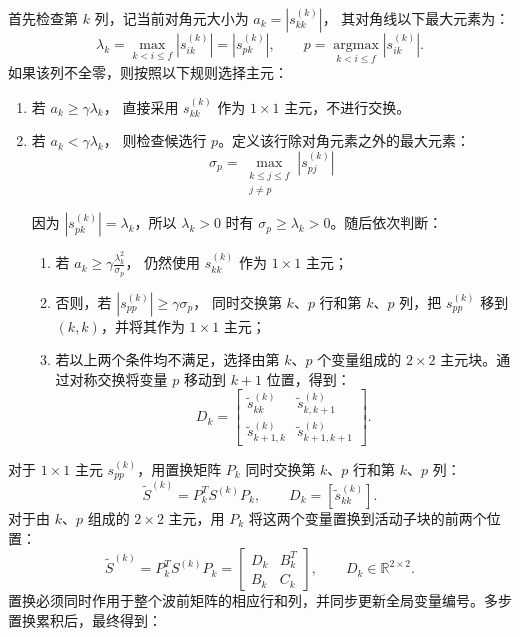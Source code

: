 首先检查第 $k$ 列，记当前对角元大小为 $a_k=\left|s_{kk}^{(k)}\right|$，
其对角线以下最大元素为：
$$
\lambda_k=\max_{k<i\le f}\left|s_{ik}^{(k)}\right|
=\left|s_{pk}^{(k)}\right|,\qquad
p=\underset{k<i\le f}{\operatorname{argmax}}
  \left|s_{ik}^{(k)}\right|.$$
如果该列不全零，则按照以下规则选择主元：
\begin{enumerate}
  \item 若
  $a_k\ge\gamma\lambda_k$，
  直接采用 $s_{kk}^{(k)}$ 作为 $1\times1$ 主元，不进行交换。

  \item 若
  $a_k<\gamma\lambda_k$，
  则检查候选行 $p$。定义该行除对角元素之外的最大元素：
  $$\sigma_p=
  \max_{\substack{k\le j\le f\\j\ne p}}
  \left|s_{pj}^{(k)}\right|$$

  因为 $|s_{pk}^{(k)}|=\lambda_k$，所以 $\lambda_k>0$ 时有 $\sigma_p\ge\lambda_k>0$。随后依次判断：
  \begin{enumerate}[label=(\alph*)]
    \item 若
    $a_k\ge\gamma\frac{\lambda_k^2}{\sigma_p}$，
    仍然使用 $s_{kk}^{(k)}$ 作为 $1\times1$ 主元；

    \item 否则，若
    $\left|s_{pp}^{(k)}\right|\ge\gamma\sigma_p$，
    同时交换第 $k$、$p$ 行和第 $k$、$p$ 列，把 $s_{pp}^{(k)}$ 移到 $(k,k)$，并将其作为 $1\times1$ 主元；

    \item 若以上两个条件均不满足，选择由第 $k$、$p$ 个变量组成的 $2\times2$ 主元块。通过对称交换将变量 $p$ 移动到 $k+1$ 位置，得到：
    \[
    D_k=
    \begin{bmatrix}
    \widetilde s_{kk}^{(k)}&\widetilde s_{k,k+1}^{(k)}\\
    \widetilde s_{k+1,k}^{(k)}&\widetilde s_{k+1,k+1}^{(k)}
    \end{bmatrix}.
    \]
  \end{enumerate}
\end{enumerate}
对于 $1\times1$ 主元 $s_{pp}^{(k)}$，用置换矩阵 $P_k$ 同时交换第 $k$、$p$ 行和第 $k$、$p$ 列：
$$\widetilde S^{(k)}=P_k^TS^{(k)}P_k,
\qquad
D_k=\left[\widetilde s_{kk}^{(k)}\right].$$
对于由 $k$、$p$ 组成的 $2\times2$ 主元，用 $P_k$ 将这两个变量置换到活动子块的前两个位置：
$$\widetilde S^{(k)}=P_k^TS^{(k)}P_k
=
\begin{bmatrix}
D_k&B_k^T\\
B_k&C_k
\end{bmatrix},
\qquad
D_k\in\mathbb R^{2\times2}.$$
置换必须同时作用于整个波前矩阵的相应行和列，并同步更新全局变量编号。多步置换累积后，最终得到：
